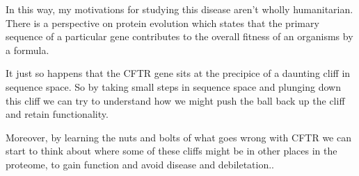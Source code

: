 In this way, my motivations for studying this disease aren't wholly humanitarian. There is a perspective on protein evolution which states that the primary sequence of a particular gene contributes to the overall fitness of an organisms by a formula. \cite{}


It just so happens that the CFTR gene sits at the precipice of a daunting cliff in sequence space. So by taking small steps in sequence space and plunging down this cliff we can try to understand how we might push the ball back up the cliff and retain functionality.

Moreover, by learning the nuts and bolts of what goes wrong with CFTR we can start to think about where some of these cliffs might be in other places in the proteome, to gain function and avoid disease and debiletation..

